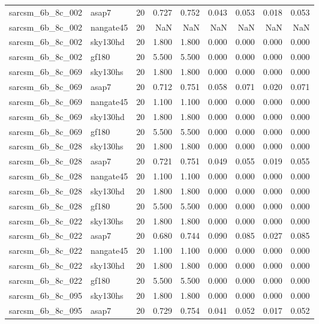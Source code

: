 \begin{tabular}{llrrrrrrr}
sarcsm\_6b\_8c\_002 & asap7 & 20 & 0.727 & 0.752 & 0.043 & 0.053 & 0.018 & 0.053 \\
sarcsm\_6b\_8c\_002 & nangate45 & 20 & NaN & NaN & NaN & NaN & NaN & NaN \\
sarcsm\_6b\_8c\_002 & sky130hd & 20 & 1.800 & 1.800 & 0.000 & 0.000 & 0.000 & 0.000 \\
sarcsm\_6b\_8c\_002 & gf180 & 20 & 5.500 & 5.500 & 0.000 & 0.000 & 0.000 & 0.000 \\
sarcsm\_6b\_8c\_069 & sky130hs & 20 & 1.800 & 1.800 & 0.000 & 0.000 & 0.000 & 0.000 \\
sarcsm\_6b\_8c\_069 & asap7 & 20 & 0.712 & 0.751 & 0.058 & 0.071 & 0.020 & 0.071 \\
sarcsm\_6b\_8c\_069 & nangate45 & 20 & 1.100 & 1.100 & 0.000 & 0.000 & 0.000 & 0.000 \\
sarcsm\_6b\_8c\_069 & sky130hd & 20 & 1.800 & 1.800 & 0.000 & 0.000 & 0.000 & 0.000 \\
sarcsm\_6b\_8c\_069 & gf180 & 20 & 5.500 & 5.500 & 0.000 & 0.000 & 0.000 & 0.000 \\
sarcsm\_6b\_8c\_028 & sky130hs & 20 & 1.800 & 1.800 & 0.000 & 0.000 & 0.000 & 0.000 \\
sarcsm\_6b\_8c\_028 & asap7 & 20 & 0.721 & 0.751 & 0.049 & 0.055 & 0.019 & 0.055 \\
sarcsm\_6b\_8c\_028 & nangate45 & 20 & 1.100 & 1.100 & 0.000 & 0.000 & 0.000 & 0.000 \\
sarcsm\_6b\_8c\_028 & sky130hd & 20 & 1.800 & 1.800 & 0.000 & 0.000 & 0.000 & 0.000 \\
sarcsm\_6b\_8c\_028 & gf180 & 20 & 5.500 & 5.500 & 0.000 & 0.000 & 0.000 & 0.000 \\
sarcsm\_6b\_8c\_022 & sky130hs & 20 & 1.800 & 1.800 & 0.000 & 0.000 & 0.000 & 0.000 \\
sarcsm\_6b\_8c\_022 & asap7 & 20 & 0.680 & 0.744 & 0.090 & 0.085 & 0.027 & 0.085 \\
sarcsm\_6b\_8c\_022 & nangate45 & 20 & 1.100 & 1.100 & 0.000 & 0.000 & 0.000 & 0.000 \\
sarcsm\_6b\_8c\_022 & sky130hd & 20 & 1.800 & 1.800 & 0.000 & 0.000 & 0.000 & 0.000 \\
sarcsm\_6b\_8c\_022 & gf180 & 20 & 5.500 & 5.500 & 0.000 & 0.000 & 0.000 & 0.000 \\
sarcsm\_6b\_8c\_095 & sky130hs & 20 & 1.800 & 1.800 & 0.000 & 0.000 & 0.000 & 0.000 \\
sarcsm\_6b\_8c\_095 & asap7 & 20 & 0.729 & 0.754 & 0.041 & 0.052 & 0.017 & 0.052 \\

\end{tabular}
